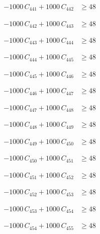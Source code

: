 \documentclass[a4paper,11pt]{article}
\begin{document}
\begin{align}
-1000\,C_{441} + 1000\,C_{442} &\geq 48 \nonumber
\end{align}

\begin{align}
-1000\,C_{442} + 1000\,C_{443} &\geq 48 \nonumber
\end{align}

\begin{align}
-1000\,C_{443} + 1000\,C_{444} &\geq 48 \nonumber
\end{align}

\begin{align}
-1000\,C_{444} + 1000\,C_{445} &\geq 48 \nonumber
\end{align}

\begin{align}
-1000\,C_{445} + 1000\,C_{446} &\geq 48 \nonumber
\end{align}

\begin{align}
-1000\,C_{446} + 1000\,C_{447} &\geq 48 \nonumber
\end{align}

\begin{align}
-1000\,C_{447} + 1000\,C_{448} &\geq 48 \nonumber
\end{align}

\begin{align}
-1000\,C_{448} + 1000\,C_{449} &\geq 48 \nonumber
\end{align}

\begin{align}
-1000\,C_{449} + 1000\,C_{450} &\geq 48 \nonumber
\end{align}

\begin{align}
-1000\,C_{450} + 1000\,C_{451} &\geq 48 \nonumber
\end{align}

\begin{align}
-1000\,C_{451} + 1000\,C_{452} &\geq 48 \nonumber
\end{align}

\begin{align}
-1000\,C_{452} + 1000\,C_{453} &\geq 48 \nonumber
\end{align}

\begin{align}
-1000\,C_{453} + 1000\,C_{454} &\geq 48 \nonumber
\end{align}

\begin{align}
-1000\,C_{454} + 1000\,C_{455} &\geq 48 \nonumber
\end{align}
\end{document}
